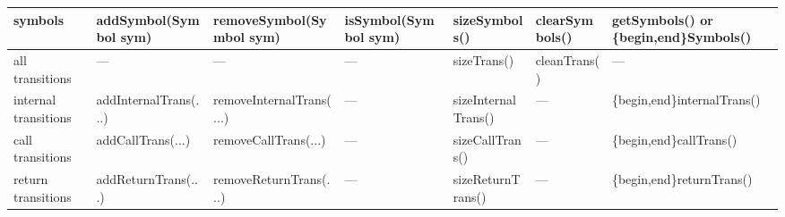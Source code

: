 \begin{sidewaystable}
\begin{threeparttable}
\begin{tabular}{p{0.75in}p{1.55in}p{1.6in}p{1.35in}p{1.27in}p{1.2in}p{1.5in}}
symbols          &  addSymbol(Symbol sym)                   &  removeSymbol(Symbol sym)                 &  isSymbol(Symbol sym)      &  sizeSymbols()        &  clearSymbols()\tnote{5}   &  getSymbols() or \newline
                                                                                                                                                                                             \{begin,end\}Symbols()        \\
\hline %
all \newline
transitions      &  ---                                     &  ---                                      &  ---                       &  sizeTrans()          &  cleanTrans()              &  ---                           \\
internal \newline
transitions      &  addInternalTrans(\phantom{.}...\tnote{6}\phantom{a})
                                                            &  removeInternalTrans(\phantom{.}...\tnote{6}\phantom{a})
                                                                                                        &  ---                       &  sizeInternalTrans()  &  ---                       &  \{begin,end\}internalTrans()  \\
call \newline
transitions      &  addCallTrans(\phantom{.}...\tnote{6}\phantom{a})
                                                            &  removeCallTrans(\phantom{.}...\tnote{6}\phantom{a})
                                                                                                        &  ---                       &  sizeCallTrans()      &  ---                       &  \{begin,end\}callTrans()      \\
return \newline
transitions      &  addReturnTrans(\phantom{.}...\tnote{6}\phantom{a})
                                                            &  removeReturnTrans(\phantom{.}...\tnote{6}\phantom{a})
                                                                                                        &  ---                       &  sizeReturnTrans()  &  ---                       &  \{begin,end\}returnTrans()\\
\hline
\end{tabular}
\begin{tablenotes}

\end{tablenotes}
\end{threeparttable}
\end{sidewaystable}
